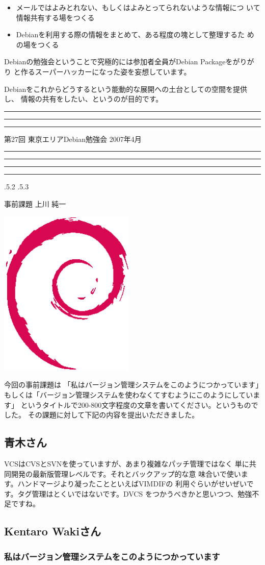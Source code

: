 \documentclass[mingoth,a4paper]{jsarticle}
\makeatletter
\newcommand{\debmtgyear}{2007}
\newcommand{\debmtgmonth}{4}
\newcommand{\debmtgnumber}{27}
\renewcommand{\section}{\@startsection{section}{1}{\z@}%
    {\Cvs \@plus.5\Cdp \@minus.2\Cdp}%
    {.5\Cvs \@plus.3\Cdp}%
    {\normalfont\gt\fontsize{32}{32}\headfont\raggedright}} %
\newcommand{\dancersection}[2]{%
\newpage
第\debmtgnumber{}回 東京エリアDebian勉強会 \debmtgyear{}年\debmtgmonth{}月
\hrule
\vspace{0.5mm}
\hrule
%
\vspace{4cm}
\hrule
\vspace{0.5mm}
\hrule
%
\vspace{-7cm}
\begin{minipage}[b]{0.7\hsize}
\section{#1}
\hfill{}#2\\
\vspace{2cm}
\end{minipage}
\begin{minipage}[b]{0.3\hsize}
\hfill{}\includegraphics[height=8cm]{image200502/openlogo-nd.eps}\\
\end{minipage}
%
\vspace{-1cm}
}
\makeatother
\begin{document}
 \begin{itemize}
 \item メールではよみとれない、もしくはよみとってられないような情報につ
       いて情報共有する場をつくる
 \item Debianを利用する際の情報をまとめて、ある程度の塊として整理するた
       めの場をつくる
 \end{itemize}

 Debianの勉強会ということで究極的には参加者全員がDebian Packageをがりがり
 と作るスーパーハッカーになった姿を妄想しています。

 Debianをこれからどうするという能動的な展開への土台としての空間を提供し、
 情報の共有をしたい、というのが目的です。


\newpage

\begin{minipage}[b]{0.2\hsize}
 \colorbox{titleback}{}
\end{minipage}
\begin{minipage}[b]{0.8\hsize}
\hrule
\vspace{2mm}
\hrule
\tableofcontents
\vspace{2mm}
\hrule
\end{minipage}

\dancersection{事前課題}{上川 純一}

今回の事前課題は
「私はバージョン管理システムをこのようにつかっています」もしくは「バージョン管理システムを使わなくてすむようにこのようにしています」
というタイトルで200-800文字程度の文章を書いてください。というものでした。
その課題に対して下記の内容を提出いただきました。

\subsection{青木さん}

VCSはCVSとSVNを使っていますが、あまり複雑なパッチ管理ではなく
単に共同開発の最新版管理レベルです。それとバックアップ的な意
味合いで使います。ハンドマージより凝ったことといえばVIMDIFの
利用ぐらいがせいぜいです。タグ管理はとくいではないです。DVCS
をつかうべきかと思いつつ、勉強不足ですね。

\subsection{Kentaro Wakiさん}
\subsubsection{私はバージョン管理システムをこのようにつかっています}
\end{document}
